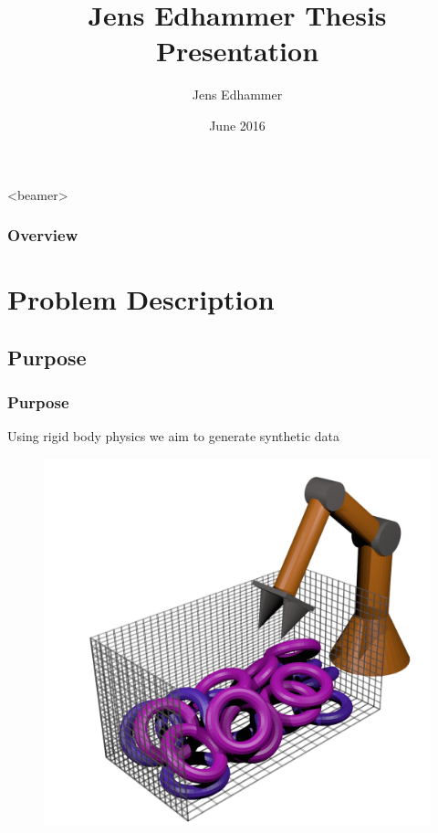 \documentclass{beamer}
\title[Thesis Presentation]{Jens Edhammer Thesis Presentation} %
\author{Jens Edhammer} %
\institute[LiU] %
{
Link\"{o}pings Universitet \\ %
\medskip
\textit{} %
}
\date{June 2016} %
\begin{document}
	\begin{frame}
		\titlepage %
	\end{frame}

	\begin{frame}<beamer>
		\begin{multicols}{2}
			\frametitle{Overview}
			\tableofcontents
		\end{multicols}
	\end{frame}


	\section{Problem Description} %

	\subsection{Purpose}
	\begin{frame}
		\frametitle{Purpose}
		Using rigid body physics we aim to generate synthetic data
		\begin{figure}
			\includegraphics[width=0.6\linewidth]{fig/binBlender.png}
		\end{figure}
	\end{frame}
\end{document}
